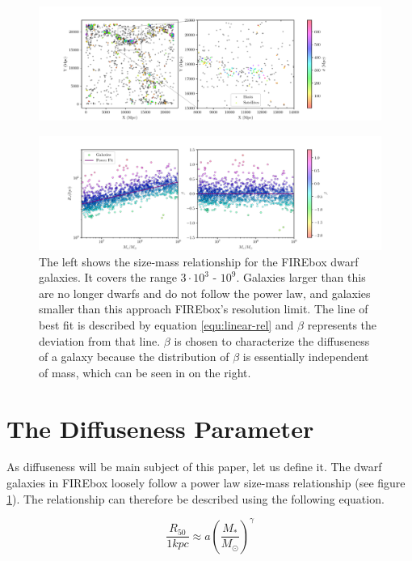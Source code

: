 \begin{figure}
    \centering
    \includegraphics*[width=\textwidth*11/10]{figs/me/locations.pdf}
    
\end{figure}

\begin{figure}
    \centering
    \includegraphics[width=\textwidth*11/10]{figs/me/stars-mass-size-r50.pdf}
    \caption{
        The left shows the size-mass relationship for the FIREbox dwarf galaxies. It covers the range $3 \cdot 10^3$ - $10^9$. Galaxies larger than this are no longer dwarfs and do not follow the power law, and galaxies smaller than this approach FIREbox's resolution limit. The line of best fit is described by equation \ref{equ:linear-rel} and $\beta$ represents the deviation from that line. $\beta$ is chosen to characterize the diffuseness of a galaxy because the distribution of $\beta$ is essentially independent of mass, which can be seen in on the right.
    }
    \label{fig:size-mass}
\end{figure}

\section{The Diffuseness Parameter}
As diffuseness will be main subject of this paper, let us define it. The dwarf galaxies in FIREbox loosely follow a power law size-mass relationship (see figure \ref{fig:size-mass}). The relationship can therefore be described using the following equation.

\begin{equation}
    \frac{R_{50}}{1 kpc} \approx a
    \left(
        \frac{M_*}{M_\odot}
    \right)
    ^{\gamma}
\end{equation}

